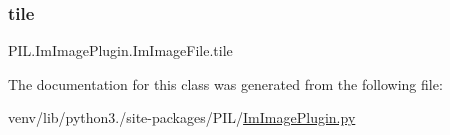 \mbox{\label{classPIL_1_1ImImagePlugin_1_1ImImageFile_a440663d16f6b522da9e3d7b7e4d5eef4}} 
\subsubsection{\texorpdfstring{tile}{tile}}
{\footnotesize\ttfamily P\+I\+L.\+Im\+Image\+Plugin.\+Im\+Image\+File.\+tile}



The documentation for this class was generated from the following file\+:\begin{DoxyCompactItemize}
\item 
venv/lib/python3./site-\/packages/\+P\+I\+L/\hyperlink{ImImagePlugin_8py}{Im\+Image\+Plugin.\+py}\end{DoxyCompactItemize}
